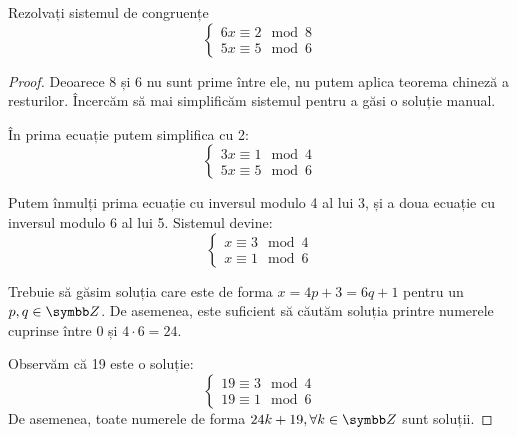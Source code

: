 \begin{exercise}[4.2]
Rezolvați sistemul de congruențe
\[
\begin{cases}
6x \equiv 2 \mod{8} \\
5x \equiv 5 \mod{6}
\end{cases}
\]
\end{exercise}
\begin{proof}
Deoarece 8 și 6 nu sunt prime între ele, nu putem aplica teorema chineză a resturilor. Încercăm să mai simplificăm sistemul pentru a găsi o soluție manual.

În prima ecuație putem simplifica cu 2:
\[
\begin{cases}
3x \equiv 1 \mod{4} \\
5x \equiv 5 \mod{6}
\end{cases}
\]

Putem înmulți prima ecuație cu inversul modulo 4 al lui 3, și a doua ecuație cu inversul modulo 6 al lui 5. Sistemul devine:
\[
\begin{cases}
x \equiv 3 \mod{4} \\
x \equiv 1 \mod{6}
\end{cases}
\]

Trebuie să găsim soluția care este de forma \(x = 4p + 3 = 6q + 1\) pentru un \(p, q \in \integers\). De asemenea, este suficient să căutăm soluția printre numerele cuprinse între 0 și \(4 \cdot 6 = 24\).

Observăm că 19 este o soluție:
\[
\begin{cases}
19 \equiv 3 \mod{4} \\
19 \equiv 1 \mod{6}
\end{cases}
\]
De asemenea, toate numerele de forma \(24k + 19, \forall k \in \integers\) sunt soluții.
\end{proof}

